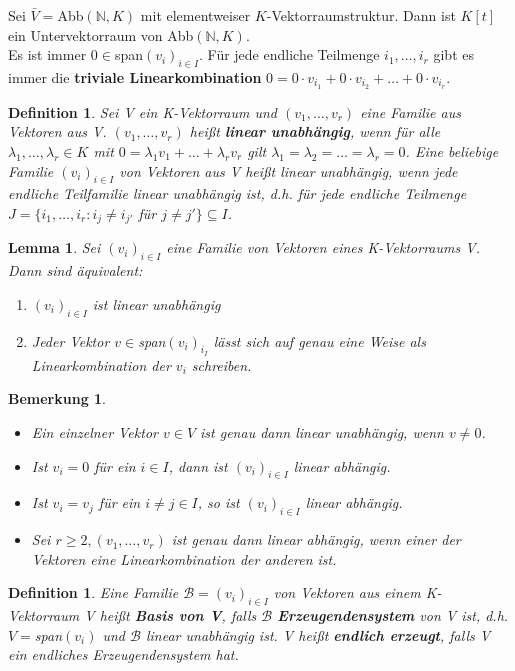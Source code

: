 \documentclass[12pt,a4paper]{article}
\theoremstyle{plain}
\newtheorem{Lemma}[Theorem]{Lemma}
\newtheorem{Definition}[Theorem]{Definition}
\newtheorem{Bemerkung}[Theorem]{Bemerkung}
\newcommand{\herv}[1]{{\emph{\textbf{#1}}}}
\newcommand{\N}{\mathbb{N}}
\numberwithin{equation}{section}
\begin{document}
Sei $\bar{V}=$Abb$(\N,K)$ mit elementweiser $K$-Vektorraumstruktur. Dann ist $K[t]$ ein Untervektorraum von Abb$(\N,K)$.\\
Es ist immer $0\in$span$(v_i)_{i\in I}$. Für jede endliche Teilmenge $i_1,\ldots,i_r$ gibt es immer die \textbf{triviale Linearkombination} $0=0\cdot v_{i_1}+0\cdot v_{i_2}+\ldots+0\cdot v_{i_r}$.
\begin{Definition}
Sei V ein K-Vektorraum und $(v_1,\ldots,v_r)$ eine Familie aus Vektoren aus V. $(v_1,\ldots,v_r)$ heißt \herv{linear unabhängig}, wenn für alle $\lambda_1 ,\ldots , \lambda_r\in K$ mit $0=\lambda_1 v_1+\ldots+\lambda_r v_r$ gilt $\lambda_1=\lambda_2=\ldots=\lambda_r=0$. Eine beliebige Familie $(v_i)_{i\in I}$ von Vektoren aus V heißt linear unabhängig, wenn jede endliche Teilfamilie linear unabhängig ist, d.h. für jede endliche Teilmenge $J=\{i_1,\ldots,i_r : i_j\neq i_{j'}$ für $j\neq j'\}\subseteq I$.
\end{Definition}
\begin{Lemma}
Sei $(v_i)_{i\in I}$ eine Familie von Vektoren eines K-Vektorraums V. Dann sind äquivalent:
\begin{enumerate}
\renewcommand{\labelenumi}{\emph{(\roman{enumi})}}
\item $(v_i)_{i\in I}$ ist linear unabhängig
\item Jeder Vektor $v\in$\emph{span}$(v_i)_{i_I}$ lässt sich auf genau eine Weise als Linearkombination der $v_i$ schreiben.
\end{enumerate}
\end{Lemma}
\begin{Bemerkung}\mbox{ }
\begin{itemize}
\item Ein einzelner Vektor $v\in V$ ist genau dann linear unabhängig, wenn $v\neq 0$.
\item Ist $v_i=0$ für ein $i\in I$, dann ist $(v_i)_{i\in I}$ linear abhängig.
\item Ist $v_i=v_j$ für ein $i\neq j \in I$, so ist $(v_i)_{i\in I}$ linear abhängig.
\item Sei $r\geq 2, (v_1,\ldots,v_r)$ ist genau dann linear abhängig, wenn einer der Vektoren eine Linearkombination der anderen ist.
\end{itemize}
\end{Bemerkung}
\begin{Definition}
Eine Familie $\mathcal{B}=(v_i)_{i\in I}$ von Vektoren aus einem K-Vektorraum V heißt \herv{Basis von V}, falls $\mathcal{B}$ \herv{Erzeugendensystem} von V ist, d.h. $V=$\emph{span}$(v_i)$ und $\mathcal{B}$ linear unabhängig ist. V heißt \herv{endlich erzeugt}, falls V ein endliches Erzeugendensystem hat.
\end{Definition}
\end{document}
